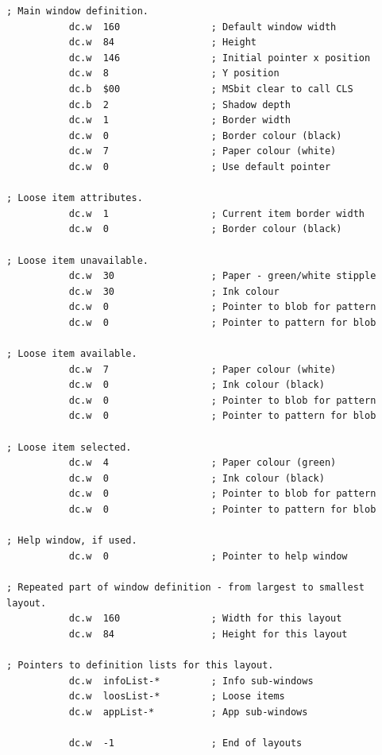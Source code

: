 \begin{lstlisting}[firstnumber=1,caption={WMAN Example Window}]
; Main window definition.
           dc.w  160                ; Default window width
           dc.w  84                 ; Height
           dc.w  146                ; Initial pointer x position 
           dc.w  8                  ; Y position
           dc.b  $00                ; MSbit clear to call CLS
           dc.b  2                  ; Shadow depth 
           dc.w  1                  ; Border width 
           dc.w  0                  ; Border colour (black)
           dc.w  7                  ; Paper colour (white)
           dc.w  0                  ; Use default pointer

; Loose item attributes.
           dc.w  1                  ; Current item border width  
           dc.w  0                  ; Border colour (black)

; Loose item unavailable.
           dc.w  30                 ; Paper - green/white stipple
           dc.w  30                 ; Ink colour 
           dc.w  0                  ; Pointer to blob for pattern
           dc.w  0                  ; Pointer to pattern for blob

; Loose item available.
           dc.w  7                  ; Paper colour (white)
           dc.w  0                  ; Ink colour (black)
           dc.w  0                  ; Pointer to blob for pattern
           dc.w  0                  ; Pointer to pattern for blob

; Loose item selected.
           dc.w  4                  ; Paper colour (green)
           dc.w  0                  ; Ink colour (black)
           dc.w  0                  ; Pointer to blob for pattern
           dc.w  0                  ; Pointer to pattern for blob

; Help window, if used.
           dc.w  0                  ; Pointer to help window

; Repeated part of window definition - from largest to smallest layout.
           dc.w  160                ; Width for this layout
           dc.w  84                 ; Height for this layout

; Pointers to definition lists for this layout.
           dc.w  infoList-*         ; Info sub-windows 
           dc.w  loosList-*         ; Loose items
           dc.w  appList-*          ; App sub-windows

           dc.w  -1                 ; End of layouts
\end{lstlisting}

